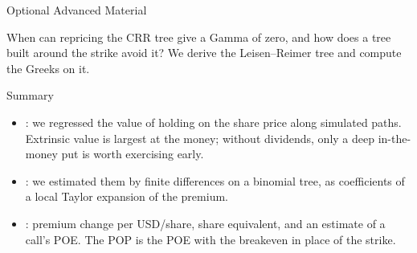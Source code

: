 \documentclass[aspectratio=169,11pt]{beamer}
\newcommand{\repo}{https://github.com/varnerlab/CHEME-5660-CourseRepository-Fall-2026/blob/main/lectures/week-10/L10a}
\begin{document}
\begin{frame}{Optional Advanced Material}
  \vspace{0.4em}
  {\normalsize\textbf{} \par
  \href{\repo/advanced/leisen_reimer/CHEME-5660-L10a-Advanced-LeisenReimer-Greeks-Fall-2026.ipynb}{}}

  \vspace{0.6em}
  When can repricing the CRR tree give a Gamma of zero, and how does a tree
  built around the strike avoid it? We derive the Leisen--Reimer tree and
  compute the Greeks on it.
\end{frame}

\begin{frame}{Summary}
  \vspace{0.3em}
  {\large\textbf{}}
  \begin{itemize}\setlength{\itemsep}{0.5em}
    \item {}: we
      regressed the value of holding on the share price along simulated paths.
      Extrinsic value is largest at the money; without dividends, only a deep
      in-the-money put is worth exercising early.
    \item {}: we estimated
      them by finite differences on a binomial tree, as coefficients of a local
      Taylor expansion of the premium.
    \item {}: premium change per USD/share,
      share equivalent, and an estimate of a call's POE. The POP is the POE
      with the breakeven in place of the strike.
  \end{itemize}
\end{frame}
\end{document}
